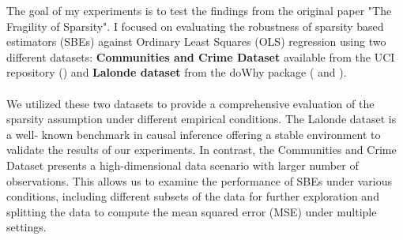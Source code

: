 The goal of my experiments is to test the findings from the original paper "The Fragility of Sparsity". I focused on evaluating the robustness of sparsity based estimators (SBEs) against Ordinary Least Squares (OLS) regression using two different datasets: \textbf{Communities and Crime Dataset} available from the UCI repository (\cite{misc_communities_and_crime_unnormalized_211}) and \textbf{Lalonde dataset} from the doWhy package (\cite{dowhy} and \cite{JMLR:v25:22-1258}).\\
\\
We utilized these two datasets to provide a comprehensive evaluation of the sparsity
assumption under different empirical conditions. The Lalonde dataset is a well-
known benchmark in causal inference offering a stable environment to validate the
results of our experiments. In contrast, the Communities and Crime Dataset
presents a high-dimensional data scenario with larger number of observations. This
allows us to examine the performance of SBEs under various conditions, including
different subsets of the data for further exploration and splitting the data to compute the mean squared error (MSE) under multiple settings.\\
\\
